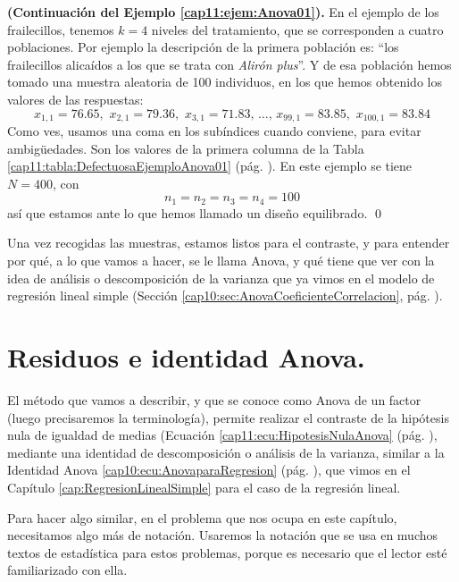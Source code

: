 \begin{ejemplo}{\bf (Continuación del Ejemplo \ref{cap11:ejem:Anova01}).}
\label{cap11:ejem:Anova01a}
En el ejemplo de los frailecillos, tenemos $k=4$ niveles del tratamiento, que se corresponden a cuatro poblaciones. Por ejemplo la descripción de la primera población es: ``los frailecillos alicaídos a los que se trata con {\em Alirón plus}''. Y de esa población hemos tomado una muestra aleatoria de 100 individuos, en los que hemos obtenido los valores de las respuestas:
\[
x_{1,1}= 76.65,\,\, x_{2,1}=79.36,\,\, x_{3,1}=71.83,\, \ldots,\, x_{99,1}=83.85,\,\, x_{100,1}= 83.84
\]
Como ves, usamos una coma en los subíndices cuando conviene, para evitar ambigüedades. Son los valores de la primera columna de la Tabla \ref{cap11:tabla:DefectuosaEjemploAnova01} (pág. \pageref{cap11:tabla:DefectuosaEjemploAnova01}). En este ejemplo se tiene $N=400$, con
\[n_1=n_2=n_3=n_4=100\]
así que estamos ante lo que hemos llamado un diseño equilibrado.
\qed
\end{ejemplo}
Una vez recogidas las muestras, estamos listos para el contraste, y para entender por qué, a lo que vamos a hacer, se le llama Anova, y qué tiene que ver con la idea de análisis o descomposición de la varianza que ya vimos en el modelo de regresión lineal simple (Sección \ref{cap10:sec:AnovaCoeficienteCorrelacion}, pág. \pageref{cap10:sec:AnovaCoeficienteCorrelacion}).

\section{Residuos e identidad Anova.}
\label{cap11:sec:ResiduosIdentidadAnova}

El método que vamos a describir, y que se conoce como Anova de un factor (luego precisaremos la terminología),  permite realizar el contraste de la hipótesis nula de igualdad de medias (Ecuación \ref{cap11:ecu:HipotesisNulaAnova} (pág. \pageref{cap11:ecu:HipotesisNulaAnova}), mediante una identidad de descomposición o análisis de la varianza, similar a la Identidad Anova \ref{cap10:ecu:AnovaparaRegresion} (pág. \pageref{cap10:ecu:AnovaparaRegresion}), que vimos en el Capítulo \ref{cap:RegresionLinealSimple}  para el caso de la regresión lineal.

Para hacer algo similar, en el problema que nos ocupa en este capítulo, necesitamos algo más de notación. Usaremos la notación que se usa en muchos textos de estadística para estos problemas, porque es necesario que el lector esté familiarizado con ella.

